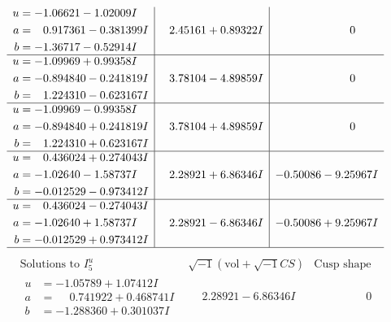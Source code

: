 \documentclass[1p]{elsarticle_modified}
\theoremstyle{definition}
\newcommand{\I}{\sqrt{-1}}
\begin{document}
$$\begin{array}{c|c|c}
\begin{aligned}
u &= -1.06621 - 1.02009 I \\
a &= \phantom{-}0.917361 - 0.381399 I \\
b &= -1.36717 - 0.52914 I\end{aligned}
 & \phantom{-}2.45161 + 0.89322 I & \phantom{-0.000000 } 0 \\ \hline\begin{aligned}
u &= -1.09969 + 0.99358 I \\
a &= -0.894840 - 0.241819 I \\
b &= \phantom{-}1.224310 - 0.623167 I\end{aligned}
 & \phantom{-}3.78104 - 4.89859 I & \phantom{-0.000000 } 0 \\ \hline\begin{aligned}
u &= -1.09969 - 0.99358 I \\
a &= -0.894840 + 0.241819 I \\
b &= \phantom{-}1.224310 + 0.623167 I\end{aligned}
 & \phantom{-}3.78104 + 4.89859 I & \phantom{-0.000000 } 0 \\ \hline\begin{aligned}
u &= \phantom{-}0.436024 + 0.274043 I \\
a &= -1.02640 - 1.58737 I \\
b &= -0.012529 - 0.973412 I\end{aligned}
 & \phantom{-}2.28921 + 6.86346 I & -0.50086 - 9.25967 I \\ \hline\begin{aligned}
u &= \phantom{-}0.436024 - 0.274043 I \\
a &= -1.02640 + 1.58737 I \\
b &= -0.012529 + 0.973412 I\end{aligned}
 & \phantom{-}2.28921 - 6.86346 I & -0.50086 + 9.25967 I\\
 \hline 
 \end{array}$$\newpage$$\begin{array}{c|c|c}  
\text{Solutions to }I^u_{5}& \I (\text{vol} + \sqrt{-1}CS) & \text{Cusp shape}\\
 \hline 
\begin{aligned}
u &= -1.05789 + 1.07412 I \\
a &= \phantom{-}0.741922 + 0.468741 I \\
b &= -1.288360 + 0.301037 I\end{aligned}
 & \phantom{-}2.28921 - 6.86346 I & \phantom{-0.000000 } 0 \\ \hline\begin{aligned}

\end{aligned}
\end{array}$$
\end{document}
